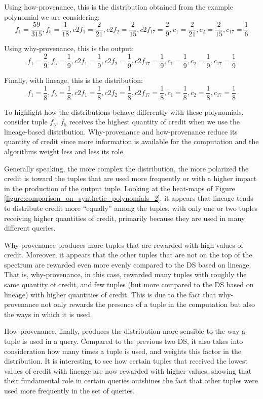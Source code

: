 Using how-provenance, this is the distribution obtained from the example polynomial we are considering:
\[
f_1 = \frac{59}{315}, f_5 = \frac{1}{18}, c2f_1 = \frac{2}{21}, c2f_2 = \frac{2}{15}, 
c2f_{17}=\frac{2}{9} , c_1 = \frac{2}{21}, c_2 = \frac{2}{15}, c_{17} = \frac{1}{6} 
\]

Using why-provenance, this is the output:
\[
f_1 = \frac{2}{9}, f_5 = \frac{1}{9}, c2f_1 = \frac{1}{9}, c2f_2 = \frac{1}{9}, 
c2f_{17}=\frac{1}{9} , c_1 = \frac{1}{9}, c_2 = \frac{1}{9}, c_{17} = \frac{1}{9} 
\]

Finally, with lineage, this is the distribution:
\[
f_1 = \frac{1}{8}, f_5 = \frac{1}{8}, c2f_1 = \frac{1}{8}, c2f_2 = \frac{1}{8}, 
c2f_{17}=\frac{1}{8} , c_1 = \frac{1}{8}, c_2 = \frac{1}{8}, c_{17} = \frac{1}{8} 
\]

To highlight how the distributions behave differently with these polynomials, consider tuple $f_5$.
$f_5$ receives the highest quantity of credit when we use the lineage-based distribution. Why-provenance and how-provenance reduce its quantity of credit since more information is available for the computation and the algorithms weight less and less its role. 

Generally speaking, the more complex the distribution, the more polarized the credit is toward the tuples that are used more frequently or with a higher impact in the production of the output tuple. 
Looking at the heat-maps of Figure \ref{figure:comparison_on_synthetic_polynomials_2}, it appears that lineage tends to distribute credit more ``equally'' among the tuples, with only one or two tuples receiving higher quantities of credit, primarily because they are used in many different queries. 

Why-provenance produces more tuples that are rewarded with high values of credit. Moreover, it appears that the other tuples that are not on the top of the spectrum are rewarded even more evenly compared to the DS based on lineage. That is, why-provenance, in this case, rewarded many tuples with roughly the same quantity of credit, and few tuples (but more compared to the DS based on lineage) with higher quantities of credit.
This is due to the fact that why-provenance not only rewards the presence of a tuple in the computation but also the ways in which it is used.

How-provenance, finally, produces the distribution more sensible to the way a tuple is used in a query. Compared to the previous two DS, it also takes into consideration how many times a tuple is used, and weights this factor in the distribution. It is interesting to see how certain tuples that received the lowest values of credit with lineage are now rewarded with higher values, showing that their fundamental role in certain queries outshines the fact that other tuples were used more frequently in the set of queries.

